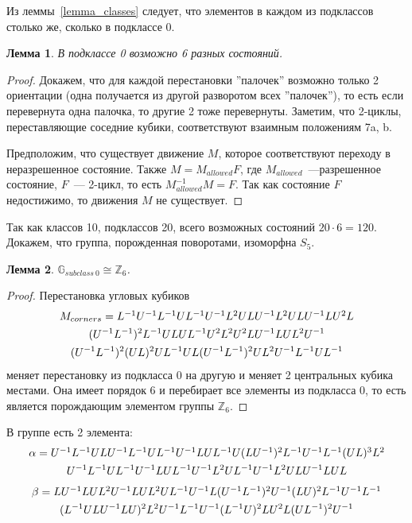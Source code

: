 \documentclass[utf8,a4paper,draft]{article}
\newtheorem{lemma_cub}{Лемма}
\begin{document}
Из леммы~\ref{lemma_classes} следует, что элементов в каждом из подклассов столько же, сколько в подклассе 0.
\begin{lemma_cub}
В подклассе 0 возможно 6 разных состояний.
\end{lemma_cub}
\begin{proof}
Докажем, что для каждой перестановки ''палочек'' возможно только 2 ориентации (одна получается из другой разворотом всех ''палочек''), то есть если перевернута одна палочка, то другие 2 тоже перевернуты.
Заметим, что 2-циклы, переставляющие соседние кубики, соответствуют взаимным положениям 7a, b.

Предположим, что существует движение $M$, которое соответствуют переходу в неразрешенное состояние. Также $M=M_{allowed}F$, где $M_{allowed}$~---разрешенное состояние, $F$~--- 2-цикл, то есть $M_{allowed}^{-1}M=F$. Так как состояние $F$ недостижимо, то движения $M$ не существует.
\end{proof}
Так как классов 10, подклассов 20, всего возможных состояний $20\cdot 6=120$.
Докажем, что группа, порожденная поворотами, изоморфна $S_5$.
\begin{lemma_cub}
\label{lemma4}
$\mathbb{G}_{subclass~0} \cong \mathbb{Z}_6$.
\end{lemma_cub}
\begin{proof}
Перестановка угловых кубиков
\begin{multline*}
$$
M_{corners}=L^{-1}U^{-1}L^{-1}UL^{-1}U^{-1}L^2ULU^{-1}L^2ULU^{-1}LU^2L \\
	(U^{-1}L^{-1})^2L^{-1}ULUL^{-1}U^2L^2U^2LU^{-1}LUL^2U^{-1} \\
		(U^{-1}L^{-1})^2(UL)^2UL^{-1}UL(U^{-1}L^{-1})^2UL^2U^{-1}L^{-1}UL^{-1}
$$
\end{multline*}
меняет перестановку из подкласса 0 на другую и меняет 2 центральных кубика местами. Она имеет порядок 6 и перебирает все элементы из подкласса 0, то есть является порождающим элементом группы $\mathbb{Z}_6$.
\end{proof}
В группе есть 2 элемента:
\begin{multline*} %
$$
\alpha=U^{-1}L^{-1}ULU^{-1}L^{-1}UL^{-1}U^{-1}LUL^{-1}U(LU^{-1})^2L^{-1}U^{-1}L^{-1}(UL)^3L^2 \\
	U^{-1}L^{-1}UL^{-1}U^{-1}LUL^{-1}U^{-1}L^2UL^{-1}U^{-1}L^2ULU^{-1}LUL
$$
\end{multline*}
\begin{multline*} %
$$
\beta=LU^{-1}LUL^2U^{-1}LUL^2UL^{-1}U^{-1}L(U^{-1}L^{-1})^2U^{-1}(LU)^2L^{-1}U^{-1}L^{-1}\\ 
		(L^{-1}ULU^{-1}LU)^2L^2U^{-1}L^{-1}U^{-1}(L^{-1}U)^2LU^2L(UL^{-1})^2U^{-1}
$$
\end{multline*}
\end{document}
